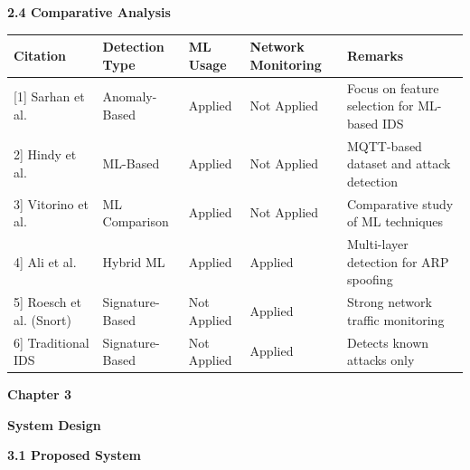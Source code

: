 \textbf{2.4 Comparative Analysis}

{\def\LTcaptype{none} %
\begin{longtable}[]{@{}
  >{\raggedright\arraybackslash}p{}
  >{\raggedright\arraybackslash}p{}
  >{\raggedright\arraybackslash}p{}
  >{\raggedright\arraybackslash}p{}
  >{\raggedright\arraybackslash}p{}@{}}
\toprule\noalign{}
\begin{minipage}[b]{\linewidth}\centering
\textbf{Citation}
\end{minipage} & \begin{minipage}[b]{\linewidth}\centering
\textbf{Detection Type}
\end{minipage} & \begin{minipage}[b]{\linewidth}\centering
\textbf{ML Usage}
\end{minipage} & \begin{minipage}[b]{\linewidth}\centering
\textbf{Network Monitoring}
\end{minipage} & \begin{minipage}[b]{\linewidth}\centering
\textbf{Remarks}
\end{minipage} \\
\midrule\noalign{}
\endhead
\bottomrule\noalign{}
\endlastfoot
{[}1{]} Sarhan et al. & Anomaly-Based & Applied & Not Applied & Focus on
feature selection for ML-based IDS \\
{[}2{]} Hindy et al. & ML-Based & Applied & Not Applied & MQTT-based
dataset and attack detection \\
{[}3{]} Vitorino et al. & ML Comparison & Applied & Not Applied &
Comparative study of ML techniques \\
{[}4{]} Ali et al. & Hybrid ML & Applied & Applied & Multi-layer
detection for ARP spoofing \\
{[}5{]} Roesch et al. (Snort) & Signature-Based & Not Applied & Applied
& Strong network traffic monitoring \\
{[}6{]} Traditional IDS & Signature-Based & Not Applied & Applied &
Detects known attacks only \\
\end{longtable}
}

\textbf{Chapter 3}

\textbf{System Design}

\textbf{3.1 Proposed System}


